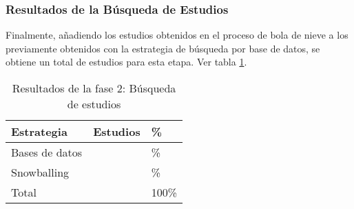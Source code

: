 \newcommand{\totalEtapaDos}{\fpeval{\screenTot + \snowballNewStudies}}
\newcommand{\dbPercentEtapa}{\fpeval{round(\screenTot*100/\totalEtapaDos,2)}}
\newcommand{\snowPercentEtapa}{\fpeval{round(\snowballNewStudies*100/\totalEtapaDos,2)}}

\subsubsection{Resultados de la Búsqueda de Estudios}\label{subsubsec:resultados-busqueda}

Finalmente, añadiendo los \snowballNewStudies{} estudios obtenidos en el proceso de bola de nieve a los \screenTot{} previamente obtenidos con la estrategia de búsqueda por base de datos, se obtiene un total de \totalEtapaDos{} estudios para esta etapa. Ver tabla \ref{table:resultados_etapa_2}.

\begin{table}[htbp]
    \centering
    \caption{Resultados de la fase 2: Búsqueda de estudios}
    \label{table:resultados_etapa_2}
    \begin{tabular}{p{2.5cm}p{2cm}p{2cm}}
        \toprule
        \textbf{Estrategia} & \textbf{Estudios} & \textbf{\%} \\
        \midrule
        Bases de datos & \screenTot{} & \dbPercentEtapa{}\% \\
        \addlinespace[0.8em]
        Snowballing & \snowballNewStudies{} & \snowPercentEtapa{}\% \\
        \addlinespace[0.8em]
        Total & \totalEtapaDos & 100\% \\
        \bottomrule
    \end{tabular}
\end{table}
